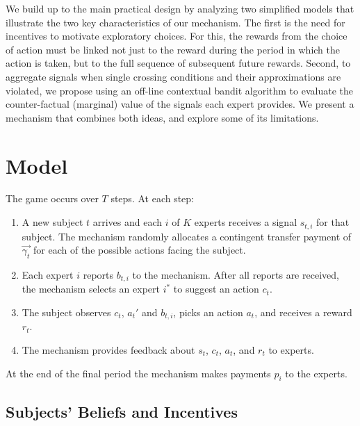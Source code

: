


We build up to the main practical design by analyzing two simplified models that illustrate the two key characteristics of our mechanism. 
The first is the need for incentives to motivate exploratory choices.
For this, the rewards from the choice of action must be linked not just to the reward during the period in which the action is taken, but to the full sequence of subsequent future rewards.
Second, to aggregate signals when single crossing conditions and their approximations are violated, we propose using an off-line contextual bandit algorithm to evaluate the counter-factual (marginal) value of the signals each expert provides.
We present a mechanism that combines both ideas, and explore some of its limitations.



\section{Model}

The game occurs over $T$ steps. At each step: 

\begin{enumerate}
\item A new subject $t$ arrives and each $i$ of $K$ experts receives a signal $s_{t,i}$ for that subject. The mechanism  randomly allocates a contingent transfer payment of $\vec{\gamma_t}$ for each of the possible actions facing the subject. %
\item Each expert $i$ reports ${b}_{t,i}$ to the mechanism. After all reports are received, the mechanism selects an expert $i^{*}$ to suggest an action $c_t$.
\item The subject observes $c_t$, $a_t'$ and ${b}_{t,i}$, picks an action $a_t$, and receives a reward $r_t$. %
\item The mechanism provides feedback about $s_t$, $c_t$, $a_t$, and $r_t$ to experts. %
\end{enumerate}

At the end of the final period the mechanism makes payments $p_i$ to the experts.


\subsection{Subjects' Beliefs and Incentives}


